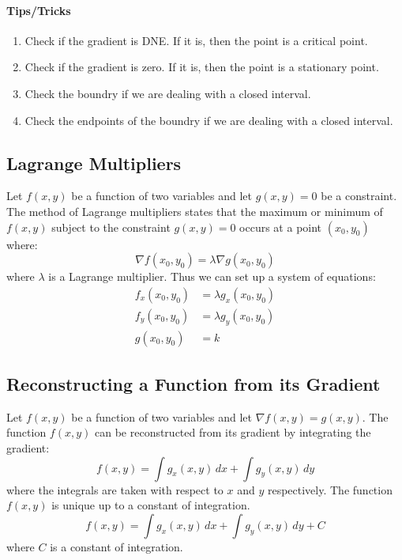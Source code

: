 \documentclass[11pt]{article}
\begin{document}
\paragraph{Tips/Tricks}
\begin{enumerate}
    \item Check if the gradient is DNE. If it is, then the point is a critical point.
    \item Check if the gradient is zero. If it is, then the point is a stationary point.
    \item Check the boundry if we are dealing with a closed interval.
    \item Check the endpoints of the boundry if we are dealing with a closed interval.
\end{enumerate}
\subsection{Lagrange Multipliers}
\begin{theorem}
    Let $f(x, y)$ be a function of two variables and let $g(x, y) = 0$ be a constraint. The method of Lagrange multipliers states that the maximum or minimum of $f(x, y)$ subject to the constraint $g(x, y) = 0$ occurs at a point $(x_0, y_0)$ where:
    \begin{equation}
        \nabla f(x_0, y_0) = \lambda \nabla g(x_0, y_0)
    \end{equation}
    where $\lambda$ is a Lagrange multiplier. Thus we can set up a system of equations:
    \begin{align}
        f_x(x_0, y_0) &= \lambda g_x(x_0, y_0) \\
        f_y(x_0, y_0) &= \lambda g_y(x_0, y_0) \\
        g(x_0, y_0) &= k
    \end{align}

\end{theorem}
\subsection{Reconstructing a Function from its Gradient}
\begin{theorem}
    Let $f(x, y)$ be a function of two variables and let $\nabla f(x, y) = g(x, y)$. The function $f(x, y)$ can be reconstructed from its gradient by integrating the gradient:
    \begin{equation}
        f(x, y) = \int g_x(x, y) \, dx + \int g_y(x, y) \, dy
    \end{equation}
    where the integrals are taken with respect to $x$ and $y$ respectively.
    The function $f(x, y)$ is unique up to a constant of integration.
    \begin{equation}
        f(x, y) = \int g_x(x, y) \, dx + \int g_y(x, y) \, dy + C
    \end{equation}
    where $C$ is a constant of integration.
\end{theorem}
\end{document}
